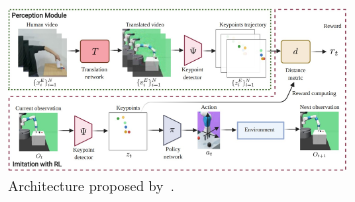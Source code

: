 \begin{figure}[t]
    \centering
    \includegraphics[width=0.8\textwidth]{figures/images/learning_by_watching/learning_by_watching.jpg}
    \caption{Architecture proposed by~\cite{xiong2021learning_by_watching}.}
    \label{fig:lbw}
\end{figure}
